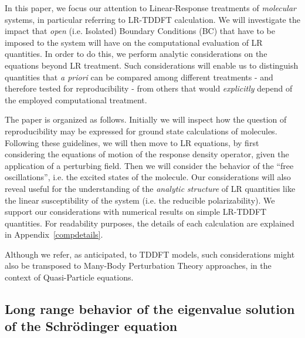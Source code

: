 \documentclass[reprint,aps,prb]{revtex4-1}
\begin{document}
In this paper, we focus our attention to Linear-Response treatments of \emph{molecular} systems,
in particular referring to LR-TDDFT calculation. We will investigate the impact that
\emph{open} (i.e. Isolated) Boundary Conditions (BC) that have to be imposed to the system will have on the computational evaluation of LR quantities.
In order to do this, we perform analytic considerations on the equations beyond LR treatment.
Such considerations will enable us to distinguish quantities that \textit{a priori} can be compared among different treatments - and therefore tested for reproducibility -
from others that would \emph{explicitly} depend of the employed computational treatment. 


The paper is organized as follows.
Initially we will inspect how the question of reproducibility may be expressed
for ground state calculations of molecules.
Following these guidelines, we will then move to LR equations,
by first considering the equations of motion of the response density operator, given
the application of a perturbing field.
Then we will consider the behavior of the ``free oscillations'', i.e. the excited states
of the molecule.
Our considerations will also reveal useful for the understanding of the \emph{analytic structure} of LR quantities like
the linear susceptibility of the system (i.e. the reducible polarizability).
We support our considerations with numerical results on simple LR-TDDFT quantities.
For readability purposes, the details of each calculation are explained in Appendix~\ref{compdetails}.

Although we refer, as anticipated, to TDDFT models, such considerations might also be transposed to Many-Body Perturbation Theory
approaches, in the context of Quasi-Particle equations.

\subsection{Long range behavior of the eigenvalue solution of the Schr\"odinger equation}
\label{SEopenSystem}
\end{document}
